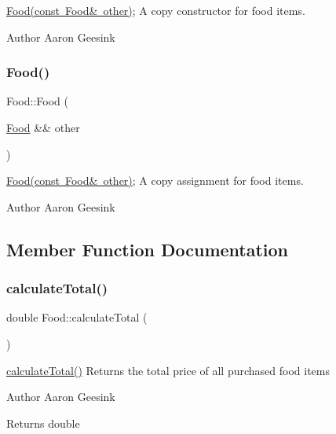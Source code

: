 \mbox{\hyperlink{class_food_a365c2d6175447d0fe29e57facc277570}{Food(const Food\& other)}}; A copy constructor for food items. 

\begin{DoxyAuthor}{Author}
Aaron Geesink 
\end{DoxyAuthor}
\mbox{\label{class_food_a82c4dcbac6b4bb4ce921bc3aea627387}} 
\subsubsection{\texorpdfstring{Food()}{Food()}\hspace{0.1cm}{\footnotesize\ttfamily [4/4]}}
{\footnotesize\ttfamily Food\+::\+Food (\begin{DoxyParamCaption}\item[{\mbox{\hyperlink{class_food}{Food}} \&\&}]{other }\end{DoxyParamCaption})}



\mbox{\hyperlink{class_food_a365c2d6175447d0fe29e57facc277570}{Food(const Food\& other)}}; A copy assignment for food items. 

\begin{DoxyAuthor}{Author}
Aaron Geesink 
\end{DoxyAuthor}


\subsection{Member Function Documentation}
\mbox{\label{class_food_ac50c1e254e20ffeda0d28f84e1cc2160}} 
\subsubsection{\texorpdfstring{calculateTotal()}{calculateTotal()}}
{\footnotesize\ttfamily double Food\+::calculate\+Total (\begin{DoxyParamCaption}{ }\end{DoxyParamCaption})}



\mbox{\hyperlink{class_food_ac50c1e254e20ffeda0d28f84e1cc2160}{calculate\+Total()}} Returns the total price of all purchased food items 

\begin{DoxyAuthor}{Author}
Aaron Geesink 
\end{DoxyAuthor}
\begin{DoxyReturn}{Returns}
double 
\end{DoxyReturn}
\mbox{\label{class_food_a5652293c23e8b797d363c08efc585601}} 
